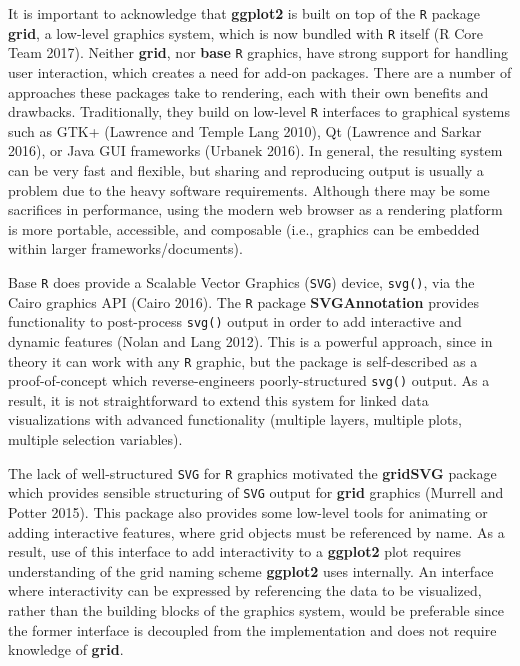 \documentclass[12pt,]{article}
\theoremstyle{definition}
\theoremstyle{definition}
\theoremstyle{definition}
\theoremstyle{remark}
\begin{document}
It is important to acknowledge that \textbf{ggplot2} is built on top of
the \texttt{R} package \textbf{grid}, a low-level graphics system, which
is now bundled with \texttt{R} itself (R Core Team 2017). Neither
\textbf{grid}, nor \textbf{base} \texttt{R} graphics, have strong
support for handling user interaction, which creates a need for add-on
packages. There are a number of approaches these packages take to
rendering, each with their own benefits and drawbacks. Traditionally,
they build on low-level \texttt{R} interfaces to graphical systems such
as GTK+ (Lawrence and Temple Lang 2010), Qt (Lawrence and Sarkar 2016),
or Java GUI frameworks (Urbanek 2016). In general, the resulting system
can be very fast and flexible, but sharing and reproducing output is
usually a problem due to the heavy software requirements. Although there
may be some sacrifices in performance, using the modern web browser as a
rendering platform is more portable, accessible, and composable (i.e.,
graphics can be embedded within larger frameworks/documents).

Base \texttt{R} does provide a Scalable Vector Graphics (\texttt{SVG})
device, \texttt{svg()}, via the Cairo graphics API (Cairo 2016). The
\texttt{R} package \textbf{SVGAnnotation} provides functionality to
post-process \texttt{svg()} output in order to add interactive and
dynamic features (Nolan and Lang 2012). This is a powerful approach,
since in theory it can work with any \texttt{R} graphic, but the package
is self-described as a proof-of-concept which reverse-engineers
poorly-structured \texttt{svg()} output. As a result, it is not
straightforward to extend this system for linked data visualizations
with advanced functionality (multiple layers, multiple plots, multiple
selection variables).

The lack of well-structured \texttt{SVG} for \texttt{R} graphics
motivated the \textbf{gridSVG} package which provides sensible
structuring of \texttt{SVG} output for \textbf{grid} graphics (Murrell
and Potter 2015). This package also provides some low-level tools for
animating or adding interactive features, where grid objects must be
referenced by name. As a result, use of this interface to add
interactivity to a \textbf{ggplot2} plot requires understanding of the
grid naming scheme \textbf{ggplot2} uses internally. An interface where
interactivity can be expressed by referencing the data to be visualized,
rather than the building blocks of the graphics system, would be
preferable since the former interface is decoupled from the
implementation and does not require knowledge of \textbf{grid}.
\end{document}
